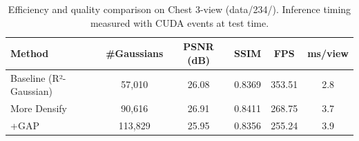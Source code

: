 \begin{table}[t]
\centering
\caption{Efficiency and quality comparison on Chest 3-view (data/234/). Inference timing measured with CUDA events at test time.}
\label{tab:efficiency}
\begin{tabular}{lccccc}
\toprule
 Method & \#Gaussians & PSNR (dB) & SSIM & FPS & ms/view \\
\midrule
 Baseline (R²-Gaussian) & 57,010 & 26.08 & 0.8369 & 353.51 & 2.8 \\
 More Densify & 90,616 & 26.91 & 0.8411 & 268.75 & 3.7 \\
 +GAP & 113,829 & 25.95 & 0.8356 & 255.24 & 3.9 \\
\bottomrule
\end{tabular}
\end{table}
